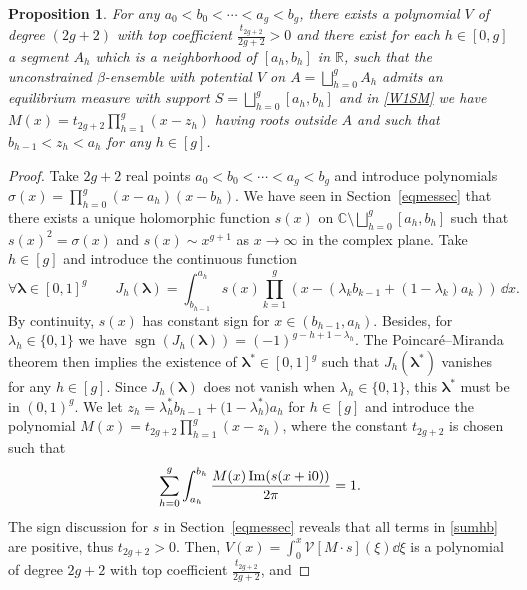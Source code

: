 \documentclass[pdftex]{sigma}
\numberwithin{equation}{section}
\newtheorem{prop}[Theorem]{Proposition}
 { \theoremstyle{definition}
\newtheorem{Definition}[Theorem]{Definition}
\newtheorem{Note}[Theorem]{Note}
\newtheorem{Example}[Theorem]{Example}
\newtheorem{Remark}[Theorem]{Remark} }
\begin{document}
\begin{prop}
\label{propallhyp} For any $a_0 < b_0 < \cdots < a_g < b_g$, there exists a polynomial $V$ of degree $(2g + 2)$ with top coefficient $\frac{t_{2g + 2}}{2g + 2} > 0$ and there exist for each $h \in [0,g]$ a segment $A_h$ which is a neighborhood of $[a_h,b_h]$ in $\mathbb{R}$, such that the unconstrained $\beta$-ensemble with potential $V$ on $A = \bigsqcup_{h = 0}^{g} A_h$ admits an equilibrium measure with support $S = \bigsqcup_{h = 0}^{g} [a_h,b_h]$ and in \eqref{W1SM} we have $M(x) = t_{2g + 2}\prod_{h = 1}^g (x - z_h)$ having roots outside $A$ and such that $b_{h - 1} < z_h < a_h$ for any $h \in [g]$.
\end{prop}
\begin{proof} Take $2g + 2$ real points $a_0 < b_0 < \cdots < a_g < b_g$ and introduce polynomials $\sigma(x) = \prod_{h = 0}^{g}(x - a_h)(x - b_h)$. We have seen in Section~\ref{eqmessec} that there exists a unique holomorphic function $s(x)$ on $\mathbb{C} \setminus \bigsqcup_{h = 0}^{g} [a_h,b_h]$ such that $s(x)^2 = \sigma(x)$ and $s(x) \sim x^{g + 1}$
as $x \rightarrow \infty$ in the complex plane. Take $h \in [g]$ and introduce the continuous function
\[
\forall \boldsymbol{\lambda}\in [0,1]^{g}\qquad J_h(\boldsymbol{\lambda}) = \int_{b_{h - 1}}^{a_h} s(x) \prod_{k = 1}^{g}(x - (\lambda_k b_{k - 1} + (1 - \lambda_k) a_k))\,\dd x.
\]
By continuity, $s(x)$ has constant sign for $x \in (b_{h - 1},a_h)$. Besides, for $\lambda_h \in \{0,1\}$ we have $\operatorname{sgn}(J_{h}(\boldsymbol{\lambda})) = (-1)^{g - h + 1 - \lambda_h}$. The Poincar\'e--Miranda theorem \cite{Miranda} then implies the existence of $\boldsymbol{\lambda}^* \in [0,1]^{g}$ such that $J_h(\boldsymbol{\lambda}^*)$ vanishes for any $h \in [g]$. Since $J_h(\boldsymbol{\lambda})$ does not vanish when $\lambda_h \in \{0,1\}$, this $\boldsymbol{\lambda}^*$ must be in $(0,1)^{g}$. We let $z_h = \lambda_h^*b_{h - 1} + \big(1 - \lambda_h^*\big)a_h$ for $h \in [g]$ and introduce the polynomial $M(x) = t_{2g + 2}\prod_{h = 1}^{g} (x - z_h)$, where the constant $t_{2g + 2}$ is chosen such that
\begin{equation}
\label{sumhb}
\sum_{h = 0}^{g} \int_{a_h}^{b_h} \frac{M(x) \operatorname{Im}(s(x + {\rm i}0))}{2\pi} = 1.
\end{equation}
The sign discussion for $s$ in Section~\ref{eqmessec} reveals that all terms in \eqref{sumhb} are positive, thus $t_{2g + 2} > 0$. Then, $V(x) = \int_{0}^{x} \mathcal{V}[M \cdot s](\xi) \dd \xi$ is a polynomial of degree $2g + 2$ with top coefficient $\frac{t_{2g + 2}}{2g + 2}$, and

\end{proof}
\end{document}
